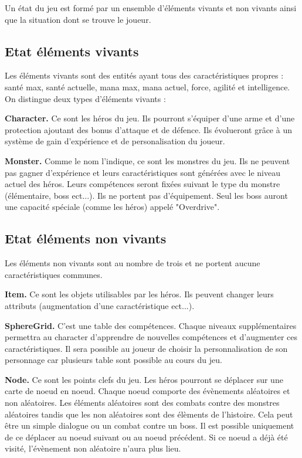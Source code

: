 \documentclass[12pt,a4paper]{report}
\begin{document}
Un \'{e}tat du jeu est form\'{e} par un ensemble d'\'{e}l\'{e}ments vivants et non vivants ainsi que la situation dont se trouve le joueur.

\subsection{Etat \'{e}l\'{e}ments vivants}

Les \'{e}l\'{e}ments vivants sont des entit\'{e}s ayant tous des caract\'{e}ristiques propres : sant\'{e} max, sant\'{e} actuelle, mana max, mana actuel, force, agilit\'{e} et intelligence.
On distingue deux types d'\'{e}l\'{e}ments vivants :

\textbf{Character.} Ce sont les h\'{e}ros du jeu. Ils pourront s'\'{e}quiper d'une arme et d'une protection ajoutant des bonus d'attaque et de d\'{e}fence. Ils \'{e}volueront grâce \`{a} un syst\`{e}me de gain d'exp\'{e}rience et de personalisation du joueur.  

\textbf{Monster.} Comme le nom l'indique, ce sont les monstres du jeu. Ils ne peuvent pas gagner d'exp\'{e}rience et leurs caract\'{e}ristiques sont g\'{e}n\'{e}r\'{e}es avec le niveau actuel des h\'{e}ros. Leurs comp\'{e}tences seront fix\'{e}es suivant le type du monstre (\'{e}l\'{e}mentaire, boss ect...). Ils ne portent pas d'\'{e}quipement. Seul les boss auront une capacit\'{e} sp\'{e}ciale (comme les h\'{e}ros) appel\'{e} "Overdrive".

\subsection{Etat \'{e}l\'{e}ments non vivants}

Les \'{e}l\'{e}ments non vivants sont au nombre de trois et ne portent aucune caract\'{e}ristiques communes. 

\textbf{Item.} Ce sont les objets utilisables par les h\'{e}ros. Ils peuvent changer leurs attributs (augmentation d'une caract\'{e}ristique ect...).

\textbf{SphereGrid.} C'est une table des comp\'{e}tences. Chaque niveaux suppl\'{e}mentaires permettra au character d'apprendre de nouvelles comp\'{e}tences et d'augmenter ces caract\'{e}ristiques. Il sera possible au joueur de choisir la personnalisation de son personnage car plusieurs table sont possible au cours du jeu.   

\textbf{Node.} Ce sont les points clefs du jeu. Les h\'{e}ros pourront se d\'{e}placer sur une carte de noeud en noeud. Chaque noeud comporte des \'{e}v\`{e}nements al\'{e}atoires et non al\'{e}atoires. Les \'{e}l\'{e}ments al\'{e}atoires sont des combats contre des monstres al\'{e}atoires tandis que les non al\'{e}atoires sont des \'{e}l\`{e}ments de l'histoire. Cela peut \^{e}tre un simple dialogue ou un combat contre un boss. Il est possible uniquement de ce d\'{e}placer au noeud suivant ou au noeud pr\'{e}c\'{e}dent. Si ce noeud a d\'{e}j\`{a} \'{e}t\'{e} visit\'{e}, l'\'{e}v\`{e}nement non al\'{e}atoire n'aura plus lieu.
\end{document}
